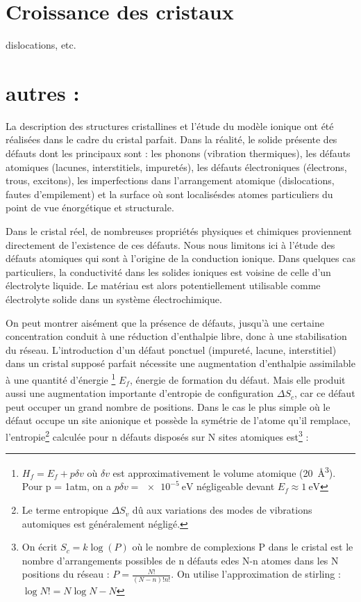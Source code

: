 \section{Croissance des cristaux}
dislocations, etc.

\section{autres :}

La description des structures cristallines et l'étude du modèle ionique ont été
réalisées dans le cadre du cristal parfait. Dans la réalité, le solide présente
des défauts dont les principaux sont : les phonons (vibration thermiques), les
défauts atomiques (lacunes, interstitiels, impuretés), les défauts électroniques
(électrons, trous, excitons), les imperfections dans l'arrangement atomique
(dislocations, fautes d'empilement) et la surface où sont localisésdes atomes
particuliers du point de vue énorgétique et structurale.

Dans le cristal réel, de nombreuses propriétés physiques et chimiques proviennent
directement de l'existence de ces défauts. Nous nous limitons ici à l'étude des
défauts atomiques qui sont à l'origine de la conduction ionique. Dans quelques
cas particuliers, la conductivité dans les solides ioniques est voisine de celle
d'un électrolyte liquide. Le matériau est alors potentiellement utilisable comme
électrolyte solide dans un système électrochimique.

On peut montrer aisément que la présence de défauts, jusqu'à une certaine
concentration conduit à une réduction d'enthalpie libre, donc à une stabilisation
du réseau. L'introduction d'un défaut ponctuel (impureté, lacune, interstitiel)
dans un cristal supposé parfait nécessite une augmentation d'enthalpie
assimilable à une quantité d'énergie
\footnote{$H_f = E_f + p\delta v$ où $\delta v$ est approximativement le volume
    atomique (\SI{20}{\cubic\angstrom}). Pour p = 1atm, on a
    $p \delta v = \SI{e-5}{\electronvolt}$ négligeable devant
$E_f \approx \SI{1}{\electronvolt}$ }
$E_f$, énergie de formation du défaut. Mais elle produit aussi une augmentation
importante d'entropie de configuration $\Delta S_c$, car ce défaut peut occuper
un grand nombre de positions. Dans le cas le plus simple où le défaut occupe un
site anionique et possède la symétrie de l'atome qu'il remplace,
l'entropie\footnote{Le terme entropique $\Delta S_v$ dû aux variations des modes
de vibrations automiques est généralement négligé.} calculée pour n défauts
disposés sur N sites atomiques est\footnote{On écrit $S_c = k \log(P)$ où le
nombre de complexions P dans le cristal est le nombre d'arrangements possibles de
n défauts edes N-n atomes dans les N positions du réseau : $P =
\frac{N!}{(N-n)!n!}$. On utilise l'approximation de stirling : $\log N! = N \log
N - N$} :

